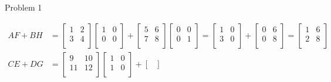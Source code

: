 \begin{problem}{Problem 1}
\begin{Highlight}[Solution]
\begin{align*}
            AF + BH & = 
            \begin{bmatrix}
                1 & 2 \\
                3 & 4 \\
            \end{bmatrix}
            \begin{bmatrix}
                1 & 0 \\
                0 & 0 \\
            \end{bmatrix}
            + 
            \begin{bmatrix}
                5 & 6 \\
                7 & 8 \\
            \end{bmatrix}
            \begin{bmatrix}
                0 & 0 \\
                0 & 1 \\
            \end{bmatrix}
            = 
            \begin{bmatrix}
                1 & 0 \\
                3 & 0 \\
            \end{bmatrix}
            + 
            \begin{bmatrix}
                0 & 6 \\
                0 & 8 \\
            \end{bmatrix}
            = 
            \begin{bmatrix}
                1 & 6 \\
                2 & 8 \\
            \end{bmatrix} \\
            CE + DG & = 
            \begin{bmatrix}
                9 & 10 \\
                11 & 12 \\
            \end{bmatrix}
            \begin{bmatrix}
                1 & 0 \\
                1 & 0 \\
            \end{bmatrix}
            + 
            \begin{bmatrix}

\end{bmatrix}
\end{align*}
\end{Highlight}
\end{problem}
